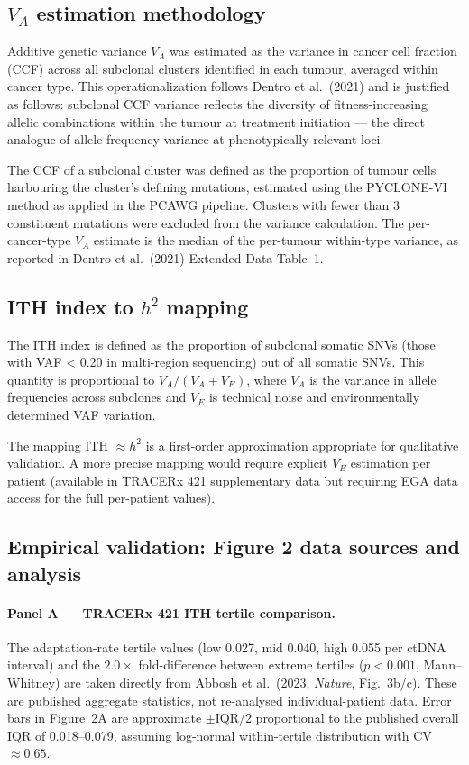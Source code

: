 \documentclass[12pt]{article}
\theoremstyle{remark}
\begin{document}
\subsection{$V_A$ estimation methodology}

Additive genetic variance $V_A$ was estimated as the variance in cancer cell fraction (CCF) across all subclonal clusters identified in each tumour, averaged within cancer type. This operationalization follows Dentro et al.\ (2021) and is justified as follows: subclonal CCF variance reflects the diversity of fitness-increasing allelic combinations within the tumour at treatment initiation --- the direct analogue of allele frequency variance at phenotypically relevant loci.

The CCF of a subclonal cluster was defined as the proportion of tumour cells harbouring the cluster's defining mutations, estimated using the PYCLONE-VI method as applied in the PCAWG pipeline. Clusters with fewer than 3 constituent mutations were excluded from the variance calculation. The per-cancer-type $V_A$ estimate is the median of the per-tumour within-type variance, as reported in Dentro et al.\ (2021) Extended Data Table~1.

\subsection{ITH index to $h^2$ mapping}

The ITH index is defined as the proportion of subclonal somatic SNVs (those with VAF < 0.20 in multi-region sequencing) out of all somatic SNVs. This quantity is proportional to $V_A / (V_A + V_E)$, where $V_A$ is the variance in allele frequencies across subclones and $V_E$ is technical noise and environmentally determined VAF variation.

The mapping ITH $\approx h^2$ is a first-order approximation appropriate for qualitative validation. A more precise mapping would require explicit $V_E$ estimation per patient (available in TRACERx 421 supplementary data but requiring EGA data access for the full per-patient values).

\subsection{Empirical validation: Figure 2 data sources and analysis}

\paragraph{Panel A --- TRACERx 421 ITH tertile comparison.}
The adaptation-rate tertile values (low 0.027, mid 0.040, high 0.055 per ctDNA interval) and the $2.0\times$ fold-difference between extreme tertiles ($p < 0.001$, Mann--Whitney) are taken directly from Abbosh et al.\ (2023, \textit{Nature}, Fig.\ 3b/c). These are published aggregate statistics, not re-analysed individual-patient data. Error bars in Figure~2A are approximate $\pm$IQR/2 proportional to the published overall IQR of 0.018--0.079, assuming log-normal within-tertile distribution with CV $\approx 0.65$.
\end{document}
